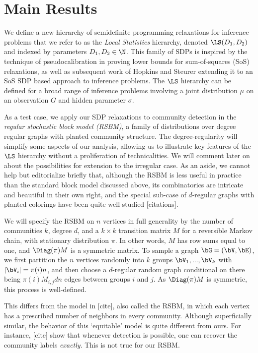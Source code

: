 \section{Main Results} %
\label{sec:main_results}

We define a new hierarchy of semidefinite programming relaxations for inference problems that we refer to as the \emph{Local Statistics} hierarchy, denoted $\LS(D_1,D_2)$ and indexed by parameters $D_1,D_2 \in \N$. This family of SDPs is inspired by the technique of pseudocalibration in proving lower bounds for sum-of-squares (SoS) relaxations, as well as subsequent work of Hopkins and Steurer \cite{hopkins2017efficient} extending it to an SoS SDP based approach to inference problems. The $\LS$ hierarchy can be defined for a broad range of inference problems involving a joint distribution $\mu$ on an observation $G$ and hidden parameter $\sigma$. 

As a test case, we apply our SDP relaxations to community detection in the \emph{regular stochastic block model (RSBM)}, a family of distributions over degree regular graphs with planted community structure. The degree-regularity will simplify some aspects of our analysis, allowing us to illustrate key features of the $\LS$ hierarchy without a proliferation of technicalities. We will comment later on about the possibilities for extension to the irregular case. As an aside, we cannot help but editorialize briefly that, although the RSBM is less useful in practice than the standard block model discussed above, its combinatorics are intricate and beautiful in their own right, and the special sub-case of $d$-regular graphs with planted colorings have been quite well-studied [citations].

We will specify the RSBM on $n$ vertices in full generality by the number of communities $k$, degree $d$, and a $k\times k$ transition matrix $M$ for a reversible Markov chain, with stationary distribution $\pi$. In other words, $M$ has row sums equal to one, and $\Diag(\pi) M$ is a symmetric matrix. To sample a graph $\bG = (\bV, \bE)$, we first partition the $n$ vertices randomly into $k$ groups $\bV_1,...,\bV_k$ with $|\bV_i| = \pi(i)n$, and then choose a $d$-regular random graph conditional on there being $\pi(i)M_{i,j} d n$ edges between groups $i$ and $j$. As $\Diag(\pi) M$ is symmetric, this process is well-defined. 

\begin{remark}
	This differs from the model in [cite], also called the RSBM, in which each vertex has a prescribed number of neighbors in every community. Although superficially similar, the behavior of this `equitable' model is quite different from ours.	For instance, [cite] show that whenever detection is possible, one can recover the community labels \emph{exactly}. This is not true for our RSBM. 
\end{remark}

